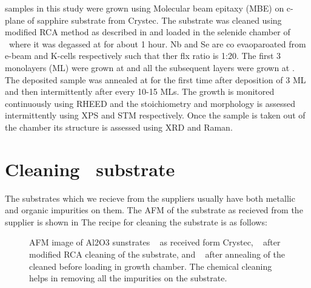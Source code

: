 \label{growth_of_nbse2}

\nbse samples in this study were  grown using Molecular beam epitaxy (MBE) on c-plane 
of sapphire substrate from Crystec. The substrate was cleaned using modified RCA method 
as described in  and loaded in the selenide chamber of \papaya\ 
where it was degassed at  for about 1 hour. Nb and Se are co evaoparoated 
from e-beam and K-cells respectively such that ther flx ratio is 1:20. The first 3 monolayers 
(ML) were grown at \temperature{570} and all the subsequent layers were grown at . 
The deposited sample was annealed at \temperature{700} for the first time after deposition of 3 ML 
and then intermittently after every 10-15 MLs. The growth is monitored continuously using RHEED and 
the stoichiometry and morphology is assessed intermittently using XPS and STM respectively. Once the 
sample is taken out of the chamber its structure is assessed using XRD and Raman.


\section{Cleaning \alumina\ substrate}

The substrates which we recieve from the suppliers usually have both metallic and organic impurities on them.
The AFM of the substrate as recieved from the supplier is shown in \tref{afm-rec-al2o3} The recipe for cleaning 
the substrate is as follows:

\begin{figure}
   
    \centering
    \caption{
        AFM image of Al2O3 sunstrates 
        \sfA~ as received form Crystec, 
        \sfB~  after modified RCA cleaning of the substrate, and 
        \sfC~  after annealing of the cleaned before loading in growth chamber. 
        The chemical cleaning helps in removing all the impurities on the substrate.
    }
\end{figure}

